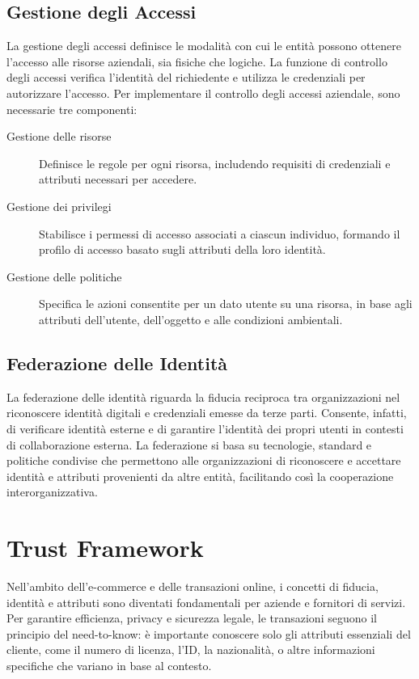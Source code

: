 \subsection{Gestione degli Accessi}

La gestione degli accessi definisce le modalità con cui le entità possono ottenere l'accesso alle risorse aziendali, sia fisiche che logiche. La funzione di controllo degli accessi verifica l'identità del richiedente e utilizza le credenziali per autorizzare l'accesso. Per implementare il controllo degli accessi aziendale, sono necessarie tre componenti:

\begin{description}
    \item[Gestione delle risorse] Definisce le regole per ogni risorsa, includendo requisiti di credenziali e attributi necessari per accedere.
    \item[Gestione dei privilegi] Stabilisce i permessi di accesso associati a ciascun individuo, formando il profilo di accesso basato sugli attributi della loro identità.
    \item[Gestione delle politiche] Specifica le azioni consentite per un dato utente su una risorsa, in base agli attributi dell'utente, dell'oggetto e alle condizioni ambientali.
\end{description}

\subsection{Federazione delle Identità}

La federazione delle identità riguarda la fiducia reciproca tra organizzazioni nel riconoscere identità digitali e credenziali emesse da terze parti. Consente, infatti, di verificare identità esterne e di garantire l'identità dei propri utenti in contesti di collaborazione esterna. La federazione si basa su tecnologie, standard e politiche condivise che permettono alle organizzazioni di riconoscere e accettare identità e attributi provenienti da altre entità, facilitando così la cooperazione interorganizzativa.

\section{Trust Framework}

Nell'ambito dell'e-commerce e delle transazioni online, i concetti di fiducia, identità e attributi sono diventati fondamentali per aziende e fornitori di servizi. Per garantire efficienza, privacy e sicurezza legale, le transazioni seguono il principio del need-to-know: è importante conoscere solo gli attributi essenziali del cliente, come il numero di licenza, l'ID, la nazionalità, o altre informazioni specifiche che variano in base al contesto.

